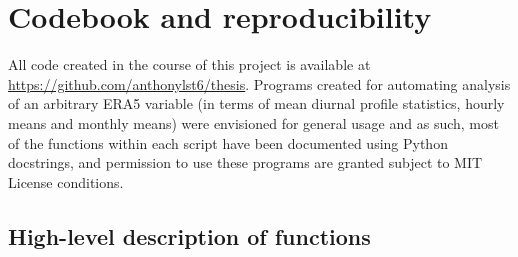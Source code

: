 \chapter{Codebook and reproducibility}
\label{app:code}

All code created in the course of this project is available at \url{https://github.com/anthonylst6/thesis}. Programs created for automating analysis of an arbitrary ERA5 variable (in terms of mean diurnal profile statistics, hourly means and monthly means) were envisioned for general usage and as such, most of the functions within each script have been documented using Python docstrings, and permission to use these programs are granted subject to MIT License conditions.

\section{High-level description of functions}

